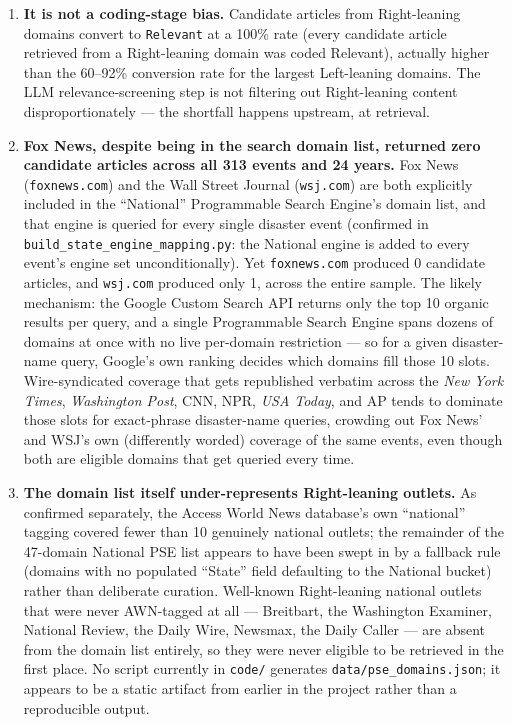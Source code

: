 \documentclass[12pt]{article}
\begin{document}
\begin{enumerate}
  \item \textbf{It is not a coding-stage bias.} Candidate articles from
  Right-leaning domains convert to \texttt{Relevant} at a 100\% rate
  (every candidate article retrieved from a Right-leaning domain was
  coded Relevant), actually higher than the 60--92\% conversion rate
  for the largest Left-leaning domains. The LLM relevance-screening
  step is not filtering out Right-leaning content disproportionately
  --- the shortfall happens upstream, at retrieval.

  \item \textbf{Fox News, despite being in the search domain list,
  returned zero candidate articles across all 313 events and 24
  years.} Fox News (\texttt{foxnews.com}) and the Wall Street Journal
  (\texttt{wsj.com}) are both explicitly included in the ``National''
  Programmable Search Engine's domain list, and that engine is queried
  for every single disaster event (confirmed in
  \texttt{build\_state\_engine\_mapping.py}: the National engine is
  added to every event's engine set unconditionally). Yet
  \texttt{foxnews.com} produced 0 candidate articles, and
  \texttt{wsj.com} produced only 1, across the entire sample. The
  likely mechanism: the Google Custom Search API returns only the top
  10 organic results per query, and a single Programmable Search
  Engine spans dozens of domains at once with no live per-domain
  restriction --- so for a given disaster-name query, Google's own
  ranking decides which domains fill those 10 slots. Wire-syndicated
  coverage that gets republished verbatim across the \emph{New York
  Times}, \emph{Washington Post}, CNN, NPR, \emph{USA Today}, and AP
  tends to dominate those slots for exact-phrase disaster-name
  queries, crowding out Fox News' and WSJ's own (differently worded)
  coverage of the same events, even though both are eligible domains
  that get queried every time.

  \item \textbf{The domain list itself under-represents Right-leaning
  outlets.} As confirmed separately, the Access World News database's
  own ``national'' tagging covered fewer than 10 genuinely national
  outlets; the remainder of the 47-domain National PSE list appears to
  have been swept in by a fallback rule (domains with no populated
  ``State'' field defaulting to the National bucket) rather than
  deliberate curation. Well-known Right-leaning national outlets that
  were never AWN-tagged at all --- Breitbart, the Washington Examiner,
  National Review, the Daily Wire, Newsmax, the Daily Caller --- are
  absent from the domain list entirely, so they were never eligible to
  be retrieved in the first place. No script currently in
  \texttt{code/} generates \texttt{data/pse\_domains.json}; it appears
  to be a static artifact from earlier in the project rather than a
  reproducible output.
\end{enumerate}
\end{document}

